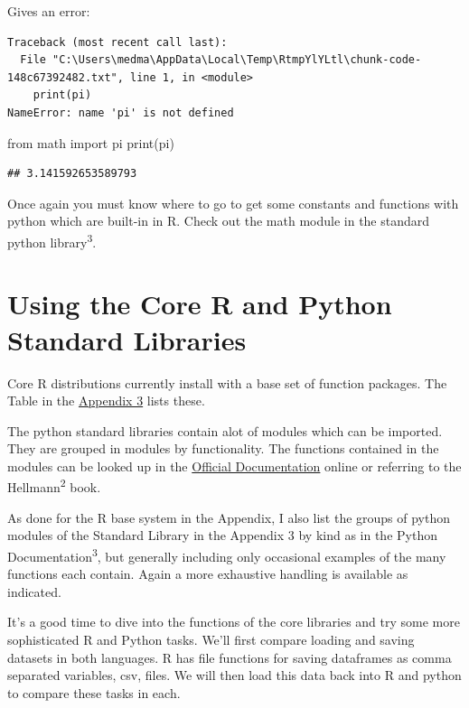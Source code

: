 \documentclass[]{book}
\newenvironment{Shaded}{\begin{snugshade}}{\end{snugshade}}
\newcommand{\ImportTok}[1]{#1}
\newcommand{\BuiltInTok}[1]{#1}
\newcommand{\NormalTok}[1]{#1}
\theoremstyle{definition}
\theoremstyle{definition}
\theoremstyle{definition}
\theoremstyle{remark}
\begin{document}
Gives an error:

\begin{verbatim}
Traceback (most recent call last):
  File "C:\Users\medma\AppData\Local\Temp\RtmpYlYLtl\chunk-code-148c67392482.txt", line 1, in <module>
    print(pi)
NameError: name 'pi' is not defined
\end{verbatim}

\begin{Shaded}
\begin{Highlighting}[]
\ImportTok{from}\NormalTok{ math }\ImportTok{import}\NormalTok{ pi}
\BuiltInTok{print}\NormalTok{(pi)}
\end{Highlighting}
\end{Shaded}

\begin{verbatim}
## 3.141592653589793
\end{verbatim}

Once again you must know where to go to get some constants and functions
with python which are built-in in R. Check out the math module in the
standard python library\textsuperscript{3}.

\section{Using the Core R and Python Standard
Libraries}\label{using-the-core-r-and-python-standard-libraries}

Core R distributions currently install with a base set of function
packages. The Table in the \href{17-Appendix_3_Packages.Rmd}{Appendix 3}
lists these.

The python standard libraries contain alot of modules which can be
imported. They are grouped in modules by functionality. The functions
contained in the modules can be looked up in the
\href{https://docs.python.org/3.7/}{Official Documentation} online or
referring to the Hellmann\textsuperscript{2} book.

As done for the R base system in the Appendix, I also list the groups of
python modules of the Standard Library in the Appendix 3 by kind as in
the Python Documentation\textsuperscript{3}, but generally including
only occasional examples of the many functions each contain. Again a
more exhaustive handling is available as indicated.

It's a good time to dive into the functions of the core libraries and
try some more sophisticated R and Python tasks. We'll first compare
loading and saving datasets in both languages. R has file functions for
saving dataframes as comma separated variables, csv, files. We will then
load this data back into R and python to compare these tasks in each.
\end{document}
